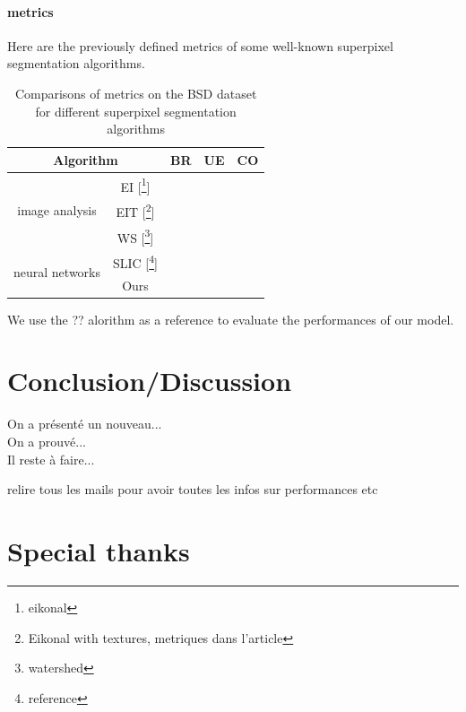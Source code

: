 \documentclass{article}
\begin{document}
            \paragraph{metrics}
            Here are the previously defined metrics of some well-known superpixel segmentation algorithms.
            \begin{table}[!ht]
                \centering
                \begin{tabular}{|c|c|ccc|}
                    \hline
                    \multicolumn{2}{|c|}{Algorithm} & BR & UE & CO\\
                    \hline
                    \hline
                    \multirow{3}{*}{image analysis} & EI [\footnote{eikonal}] & & & \\
                    & EIT [\footnote{Eikonal with textures, metriques dans l'article}] & & & \\
                    & WS [\footnote{watershed}] & & & \\
                    \hline
                    \multirow{2}{*}{neural networks} & SLIC [\footnote{reference}] & & & \\
                    & Ours & & & \\
                    \hline
                \end{tabular}
                \caption{Comparisons of metrics on the BSD dataset for different
                superpixel segmentation algorithms}
            \end{table}

            \noindent We use the ?? alorithm as a reference to evaluate the performances of our model.









\section{Conclusion/Discussion}
On a présenté un nouveau...\\
On a prouvé...\\
Il reste à faire...

relire tous les mails pour avoir toutes les infos sur performances etc

\section*{Special thanks}
\end{document}
